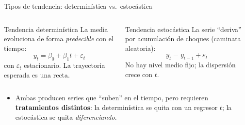 \documentclass{beamer}
\begin{document}
\begin{frame}{Tipos de tendencia: determinística vs.\ estocástica}

\begin{columns}
  \begin{block}{Tendencia determinística}
  La media evoluciona de forma \emph{predecible} con el tiempo:
  \[
  y_t = \beta_0 + \beta_1 t + \varepsilon_t
  \]
  con $\varepsilon_t$ estacionario. La trayectoria esperada es una recta.
  \end{block}

  \begin{alertblock}{Tendencia estocástica}
  La serie ``deriva'' por acumulación de choques (caminata aleatoria):
  \[
  y_t = y_{t-1} + \varepsilon_t
  \]
  No hay nivel medio fijo; la dispersión crece con $t$.
  \end{alertblock}
\end{columns}

\vspace{0.3cm}
\begin{itemize}
  \item Ambas producen series que ``suben'' en el tiempo, pero requieren \textbf{tratamientos distintos}: la determinística se quita con un regresor $t$; la estocástica se quita \emph{diferenciando}.
\end{itemize}

\end{frame}
\end{document}
